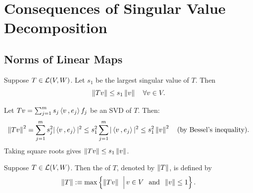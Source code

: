\section{Consequences of Singular Value Decomposition}

\subsection{Norms of Linear Maps}

\begin{thm}
  \label{thm: upper bound for ||Tv||}
  Suppose $T \in \mathcal{L} (V,W)$. Let $s_1$ be the largest singular value of $T$. Then
  \begin{equation}
    \left \lVert Tv \right \rVert \leq s_1 \left \lVert v \right \rVert \quad \forall v \in V.
  \end{equation}
\end{thm}
\begin{prf}
  Let $Tv = \sum_{j=1}^m s_j \ip{v}{e_j} f_j$ be an SVD of $T$. Then:
  \begin{equation}
    \norm{Tv}^2 = \sum_{j=1}^m s_j^2 |\ip{v}{e_j}|^2 \leq s_1^2 \sum_{j=1}^m |\ip{v}{e_j}|^2 \leq s_1^2 \norm{v}^2 \quad \text{(by Bessel's inequality)}.
  \end{equation}
  Taking square roots gives $\left \lVert Tv \right \rVert \leq s_1 \left \lVert v \right \rVert$.
\end{prf}

\begin{mydef}
  Suppose $T \in \mathcal{L} (V,W)$. Then the  of $T$, denoted by $\left \lVert T \right \rVert$, is defined by
  \begin{equation}
    \left \lVert T \right \rVert :\equiv \max \left \{ \left \lVert Tv \right \rVert \; \,\Big\vert\, v \in V \;\;\, \text{and}\;\; \left \lVert v \right \rVert \leq 1 \right \}.
  \end{equation}
\end{mydef}

